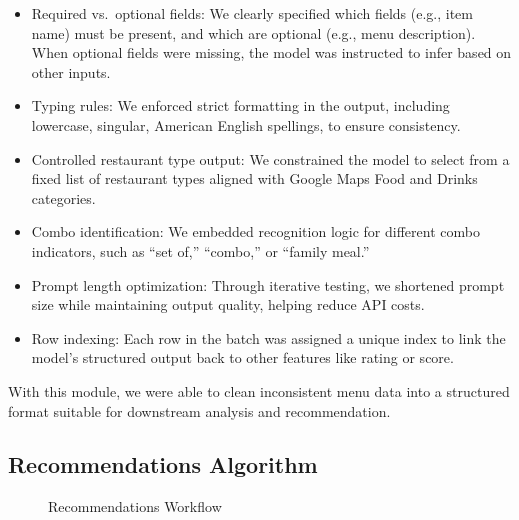 \documentclass[
  11pt,
  a4paper,
  DIV=11,
  numbers=noendperiod]{scrartcl}
\providecommand{\tightlist}{%
  \setlength{\itemsep}{0pt}\setlength{\parskip}{0pt}}\usepackage{longtable,booktabs,array}
\begin{document}
\begin{itemize}
\tightlist
\item
  Required vs.~optional fields: We clearly specified which fields (e.g.,
  item name) must be present, and which are optional (e.g., menu
  description). When optional fields were missing, the model was
  instructed to infer based on other inputs.
\item
  Typing rules: We enforced strict formatting in the output, including
  lowercase, singular, American English spellings, to ensure
  consistency.
\item
  Controlled restaurant type output: We constrained the model to select
  from a fixed list of restaurant types aligned with Google Maps Food
  and Drinks categories.
\item
  Combo identification: We embedded recognition logic for different
  combo indicators, such as ``set of,'' ``combo,'' or ``family meal.''
\item
  Prompt length optimization: Through iterative testing, we shortened
  prompt size while maintaining output quality, helping reduce API
  costs.
\item
  Row indexing: Each row in the batch was assigned a unique index to
  link the model's structured output back to other features like rating
  or score.
\end{itemize}

With this module, we were able to clean inconsistent menu data into a
structured format suitable for downstream analysis and recommendation.

\subsection{Recommendations Algorithm}\label{recommendations-algorithm}

\begin{figure}

\caption{\label{fig-rec-flow}Recommendations Workflow}


\end{figure}%
\end{document}
